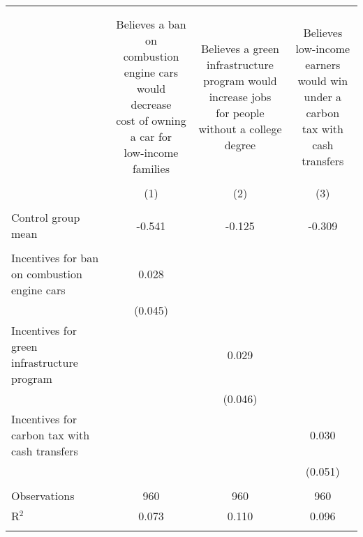 
\begin{tabular}{@{\extracolsep{5pt}}lccc} 
\\[-1.8ex]\hline 
\hline \\[-1.8ex] 
\\[-1.8ex] & \makecell{Believes a ban on combustion\\engine cars would decrease\\cost of owning a car for\\low-income families} & \makecell{Believes a green infrastructure\\program would increase jobs\\for people without a college degree} & \makecell{Believes low-income earners\\would win under a carbon\\tax with cash transfers} \\ 
\\[-1.8ex] & (1) & (2) & (3)\\ 
\hline \\[-1.8ex] 
Control group mean & -0.541 & -0.125 & -0.309  \\ \hline \\[-1.8ex]
 Incentives for ban on combustion engine cars & 0.028 &  &  \\ 
  & (0.045) &  &  \\ 
  Incentives for green infrastructure program &  & 0.029 &  \\ 
  &  & (0.046) &  \\ 
  Incentives for carbon tax with cash transfers &  &  & 0.030 \\ 
  &  &  & (0.051) \\ 
 \hline \\[-1.8ex] 

Observations & 960 & 960 & 960 \\ 
R$^{2}$ & 0.073 & 0.110 & 0.096 \\ 
\hline 
\hline \\[-1.8ex] 
\end{tabular} 